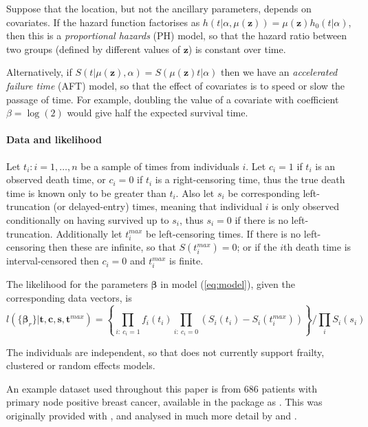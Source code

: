 \documentclass[nojss,nofooter]{jss}
\begin{document}

Suppose that the location, but not the ancillary parameters, depends
on covariates.  If the hazard function factorises as $h(t | \alpha,
\mu(\mathbf{z})) = \mu(\mathbf{z}) h_0(t | \alpha)$, then this is a
\emph{proportional hazards} (PH) model, so that the hazard ratio between
two groups (defined by different values of $\mathbf{z}$) is constant
over time.

Alternatively, if $S(t | \mu(\mathbf{z}), \alpha) =
S(\mu(\mathbf{z}) t | \alpha)$ then we have an \emph{accelerated
  failure time} (AFT) model, so that the effect of covariates is to speed or
slow the passage of time. For example, doubling the value of a
covariate with coefficient $\beta=\log(2)$ would give half the
expected survival time.


\paragraph{Data and likelihood} 

Let $t_i: i=1,\ldots, n$ be a sample of times from individuals $i$.
Let $c_i=1$ if $t_i$ is an observed death time, or $c_i=0$ if $t_i$ is
a right-censoring time, thus the true death time is known only to be
greater than $t_i$.  Also let $s_i$ be corresponding left-truncation
(or delayed-entry) times, meaning that individual $i$ is only observed
conditionally on having survived up to $s_i$, thus $s_i=0$ if there is
no left-truncation.  Additionally let $t^{max}_i$ be left-censoring
times.  If there is no left-censoring then these are infinite, so that
$S(t^{max}_i)=0$; or if the $i$th death time is interval-censored then
$c_i=0$ and $t^{max}_i$ is finite.

The likelihood for the parameters $\bm{\beta}$ in model
(\ref{eq:model}), given the corresponding data vectors, is
\begin{equation}
  \label{eq:lik}
  l(\{\bm{\beta}_r\} | \mathbf{t},\mathbf{c},\mathbf{s},\mathbf{t}^{max}) = \left\{ \prod_{i:\ c_i=1} f_i(t_i) \prod_{i:\ c_i=0} \left(S_i(t_i) - S_i(t^{max}_i)\right)\right\} / \prod_i S_i(s_i)  
\end{equation}

The individuals are independent, so that  does not
currently support frailty, clustered or random effects models.

An example dataset used throughout this paper is from 686 patients
with primary node positive breast cancer, available in the package as
. This was originally provided with  \citep{stpm:orig},
and analysed in much more detail by \citet{royston:parmar} and
\citet{sauerbrei1999building}.
\end{document}

